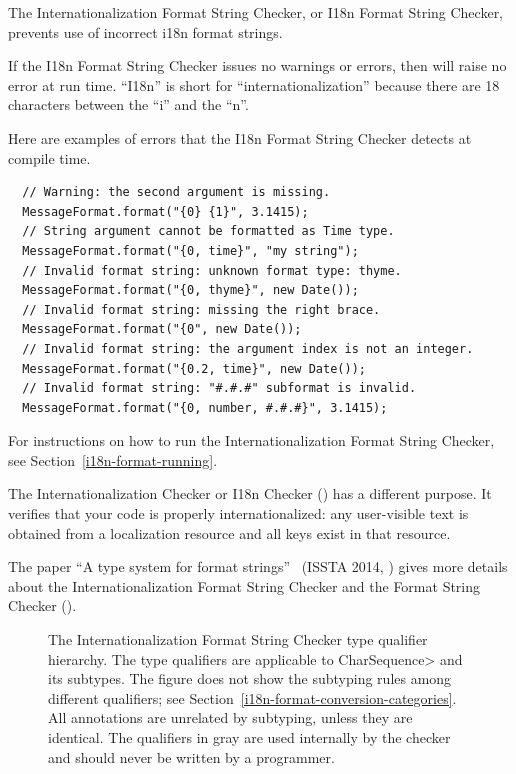
The Internationalization Format String Checker, or I18n Format String Checker,
prevents use of incorrect i18n format strings.

If the I18n Format String Checker issues no warnings or errors, then
will raise no error at run time.
``I18n'' is short for
``internationalization'' because there are 18 characters between the ``i'' and
the ``n''.

Here are examples of errors that the
I18n Format String Checker
detects at compile time.

\begin{Verbatim}
  // Warning: the second argument is missing.
  MessageFormat.format("{0} {1}", 3.1415);
  // String argument cannot be formatted as Time type.
  MessageFormat.format("{0, time}", "my string");
  // Invalid format string: unknown format type: thyme.
  MessageFormat.format("{0, thyme}", new Date());
  // Invalid format string: missing the right brace.
  MessageFormat.format("{0", new Date());
  // Invalid format string: the argument index is not an integer.
  MessageFormat.format("{0.2, time}", new Date());
  // Invalid format string: "#.#.#" subformat is invalid.
  MessageFormat.format("{0, number, #.#.#}", 3.1415);
\end{Verbatim}

For instructions on how to run the Internationalization Format String
Checker, see Section~\ref{i18n-format-running}.

The Internationalization Checker or I18n Checker ()
has a different purpose.  It verifies that your code is properly
internationalized: any user-visible text is obtained from a
localization resource and all keys exist in that resource.

The paper ``A type system for format strings''~\cite{WeitzKSE2014} (ISSTA
2014,
)
gives more details about the Internationalization Format String Checker and the Format
String Checker ().




\begin{figure}
\caption{The
  Internationalization
  Format String Checker type qualifier hierarchy.
  The type qualifiers are applicable to \<CharSequence> and its subtypes.
  The figure does not show the subtyping rules among different
  qualifiers; see
  Section~\ref{i18n-format-conversion-categories}.
  All  annotations
  are unrelated by subtyping, unless they are identical.
  The qualifiers in gray are used internally by
  the checker and should never be written by a programmer.
}
\label{i18n-format-type-hierarchy}
\end{figure}

